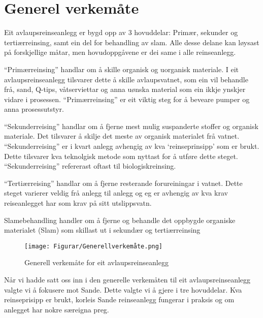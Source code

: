 \section{Generel verkemåte}

Eit avlaupsreinseanlegg er bygd opp av 3 hovuddelar: Primær, sekunder og tertiærreinsing,
samt ein del for behandling av slam.
Alle desse delane kan løysast på forskjellige måtar, men hovudoppgåvene er dei same
i alle reinseanlegg.

``Primærreinsing'' handlar om å skille organisk og uorganisk materiale.
I eit avlaupsreinseanlegg tilsvarer dette å skille avlaupsvatnet, 
som ein vil behandle frå, sand, Q-tips, våtserviettar
og anna uønska material som ein ikkje ynskjer vidare i prosessen.\newline
``Primærreinsing'' er eit viktig steg for å beveare pumper og anna prosessutstyr.

``Sekunderreising'' handlar om å fjerne mest mulig suspanderte stoffer og organisk materiale.
Det tilsvarer å skilje det meste av organisk materialet frå vatnet.
``Sekunderreising'' er i kvart anlegg avhengig av kva `reinseprinsipp' som er brukt. Dette tilsvarer
kva teknolgisk metode som nyttast for å utføre dette steget.
``Sekunderreising'' refererast oftast til biologiskreinsing.

``Tertiærreising'' handlar om å fjerne resterande forureiningar i vatnet.
Dette steget varierer veldig frå anlegg til anlegg og eg er
avhengig av kva krav reiseanlegget har som krav på sitt utslippsvatn.

Slamebehandling handler om å fjerne og behandle det oppbygde organiske materialet (Slam)
som skillast ut i sekundær og tertiærreinsing 

\begin{figure}[htbp]
    \centering
    \texttt{[image: Figurar/Generellverkemåte.png]}
    \caption{Generell verkemåte for eit avlaupsreinseanlegg}\label{fig:GenerellVerkemåte}
\end{figure}

Når vi hadde satt oss inn i den generelle verkemåten til eit avlaupsreinseanlegg
valgte vi å fokusere mot Sande.
Dette valgte vi å gjere i tre hovuddelar. Kva reinseprisipp er brukt, korleis Sande reinseanlegg
fungerar i praksis og om anlegget har nokre særeigna preg.
